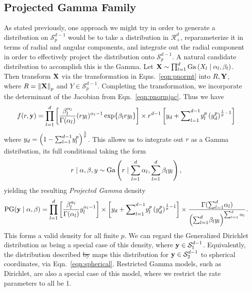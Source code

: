 \subsection{Projected Gamma Family}
As stated previously, one approach we might try in order to generate a distribution on
  $\mathcal{S}_{p}^{d-1}$ would be to take a distribution in $\mathcal{R}_{+}^d$, reparameterize
  it in terms of radial and angular components, and integrate out the radial component in order to
  effectively project the distribution onto $\mathcal{S}_{p}^{d-1}$.  A natural candidate distribution
  to accomplish this is the Gamma.  Let ${\bf X} \sim \prod_{l = 1}^d\text{Ga}\left(X_l\mid\alpha_l,\beta_l\right)$.
  Then transform ${\bf X}$ via the transformation in Eqns.~\ref{eqn:pnormt} into $R,{\bf Y}$, where
  $R = \left\lVert {\bf X} \right\rVert_{p}$ and $Y\in \mathcal{S}_{p}^{d-1}$.  Completing the transformation, we
  incorporate the determinant of the Jacobian from Eqn.~\ref{eqn:pnormjac}.  Thus we have
  \begin{equation}
    \label{eqn:protopg}
    f(r,{\bf y}) = \prod_{l = 1}^{d}
      \left[\frac{\beta_l^{\alpha_l}}{\Gamma(\alpha_l)}(ry_l)^{\alpha_l - 1}\exp\lbrace \beta_lry_l\rbrace\right]
      \times r^{d-1}\left[y_d + {\small \sum}_{l = 1}^{d-1}y_l^p\left(y_d^p\right)^{\frac{1}{p} - 1}\right]
  \end{equation}
  where $y_d = \left(1 - {\small \sum}_{l = 1}^{d-1}y_l^p\right)^{\frac{1}{p}}$.  This allows us to
  integrate out $r$ as a Gamma distribution, its full conditional taking the form
  \begin{equation}
    \label{eqn:rfullcond}
    r\mid{\bf \alpha},{\bf \beta}, y \sim \text{Ga}\left(r\mid\sum_{l = 1}^d \alpha_l, \sum_{l = 1}^d \beta_ly_l\right),
  \end{equation}
  yielding the resulting \emph{Projected Gamma} density
  \begin{equation}
    \text{PG}({\bf y}\mid{\bf \alpha},{\bf \beta}) = \prod_{l = 1}^d\left[\frac{\beta_l^{\alpha_l}}{\Gamma(\alpha_l)}y_l^{\alpha_l - 1}\right]
      \times \left[y_d + {\small \sum}_{l = 1}^{d-1}y_l^p\left(y_d^p\right)^{\frac{1}{p} - 1}\right]
      \times \frac{\Gamma({\small\sum}_{l = 1}^d\alpha_l)}{\left({\small\sum}_{l = 1}^d \beta_ly_l\right)^{{\small\sum_{l = 1}^d \alpha_l}}}.
  \end{equation}
  This forms a valid density for all finite $p$.  We can regard the Generalized Dirichlet distribution
  as being a special case of this density, where ${\bf y}\in \mathcal{S}_{1}^{d-1}$.  Equivalently,
  the distribution described \st{by}  \cite{nunez2019} maps this distribution
  for ${\bf y}\in \mathcal{S}_{2}^{d-1}$ to spherical coordinates, via Eqn.~\ref{eqn:spherical}.
  Restricted Gamma models, such as Dirichlet, are also a special case of this model, where we restrict
  the rate parameters to all be 1.

